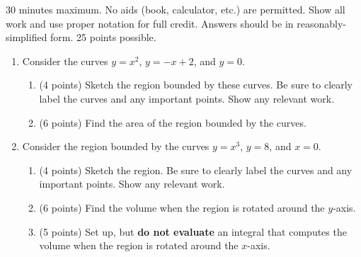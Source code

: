 \documentclass[12pt]{article}
\begin{document}
30 minutes maximum.  No aids (book, calculator, etc.) are permitted.
Show all work and use proper notation for full credit.  Answers should
be in reasonably-simplified form.  25 points possible.

\begin{enumerate}
\item Consider the curves $y=x^2$, $y=-x+2$, and $y=0$.
  \begin{enumerate}
  \item (4 points) Sketch the region bounded by these curves. Be sure to clearly
    label the curves and any important points. Show any relevant work.
    \vfill
    
  \item (6 points) Find the area of the region bounded by the curves.
    \vfill
    \vfill
  \end{enumerate}

  \newpage

\item Consider the region bounded by the curves $y=x^3$, $y=8$, and
  $x=0$.
  \begin{enumerate}
  \item (4 points) Sketch the region. Be sure to clearly label the curves and any important points. Show any relevant work.
    \vfill
    \vfill
    
  \item (6 points) Find the volume when the region is rotated around the
    $y$-axis.
    \vfill
    \vfill
    
  \item (5 points) Set up, but {\bf do not evaluate} an integral that computes
    the volume when the region is rotated around the $x$-axis.
    \vfill
  \end{enumerate}

\end{enumerate}
\end{document}
